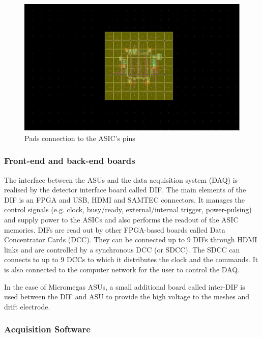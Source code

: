 \begin{figure}
\centering
\includegraphics[width=.7\columnwidth]{Calorimeter/SDHCAL_GRPC/figures/HR2_base.jpg}
\caption{Pads connection to the ASIC's pins}
\label{fig:Calorimeter:SDHCAL_GRPC:asicPins}
\end{figure}


\subsubsection{Front-end and back-end boards}

The interface between the ASUs and the data acquisition system (DAQ) is realised
by the detector interface board called DIF. The main elements of the DIF is an
FPGA and USB, HDMI and SAMTEC connectors. It manages the control signals
(e.g. clock, busy/ready, external/internal trigger, power-pulsing) and
supply power to the ASICs and also performs the readout of the ASIC memories.
DIFs are read out by other FPGA-based boards called Data Concentrator Cards
(DCC). They can be connected up to 9 DIFs through HDMI links and are controlled
by a synchronous DCC (or SDCC). The SDCC can connects to up to 9 DCCs to which
it distributes the clock and the commands. It is also connected to the computer
network for the user to control the DAQ.

In the case of Micromegas ASUs, a small additional board called inter-DIF is
used between the DIF and ASU to provide the high voltage to the meshes and drift
electrode.


\subsubsection{Acquisition Software}

